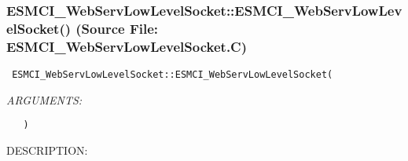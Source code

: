  
\setlength{\oldparskip}{\parskip}
\setlength{\parskip}{1.5ex}
\setlength{\oldparindent}{\parindent}
\setlength{\parindent}{0pt}
\setlength{\oldbaselineskip}{\baselineskip}
\setlength{\baselineskip}{11pt}
 
\def\bv{\begin{verbatim}}
\def\ev{\end{verbatim}}
\def\be{\begin{equation}}
\def\ee{\end{equation}}
\def\bea{\begin{eqnarray}}
\def\eea{\end{eqnarray}}
\def\bi{\begin{itemize}}
\def\ei{\end{itemize}}
\def\bn{\begin{enumerate}}
\def\en{\end{enumerate}}
\def\bd{\begin{description}}
\def\ed{\end{description}}
\def\({\left (}
\def\){\right )}
\def\[{\left [}
\def\]{\right ]}
\def\<{\left  \langle}
\def\>{\right \rangle}
\def\cI{{\cal I}}
\def\diag{\mathop{\rm diag}}
\def\tr{\mathop{\rm tr}}


 
\subsubsection{ESMCI\_WebServLowLevelSocket::ESMCI\_WebServLowLevelSocket() (Source File: ESMCI\_WebServLowLevelSocket.C)}


  
\begin{verbatim} ESMCI_WebServLowLevelSocket::ESMCI_WebServLowLevelSocket(\end{verbatim}{\em ARGUMENTS:}
\begin{verbatim}   )\end{verbatim}
{\sf DESCRIPTION:\\ }


